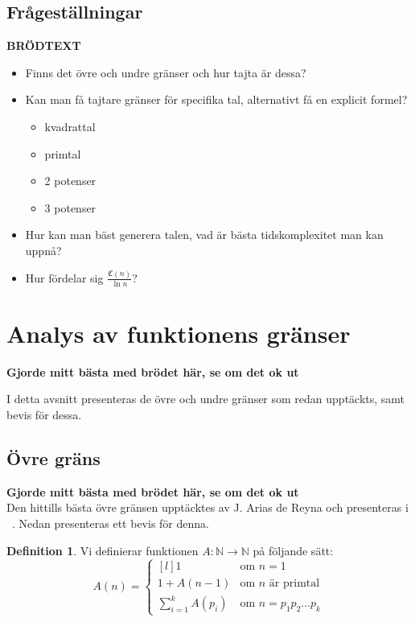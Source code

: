 \documentclass[a4paper,titlepage]{article}
\newcommand{\N}{\mathbb{N}}
\newcommand{\C}[1]{\mathfrak C \left( #1 \right)}
\newcommand{\FIX}[1]{{\color{red} \bf #1}}
\theoremstyle{definition}
\newtheorem{definition}{Definition}
\begin{document}
    \subsection{Frågeställningar}
        \FIX{BRÖDTEXT}
        \begin{itemize}
            \item Finns det övre och undre gränser och hur tajta är dessa?
            \item Kan man få tajtare gränser för specifika tal, alternativt få
                en explicit formel?
                \begin{itemize}
                    \item kvadrattal
                    \item primtal
                    \item 2 potenser
                    \item 3 potenser

                \end{itemize}
            \item Hur kan man bäst generera talen, vad är bästa tidskomplexitet
                man kan uppnå?
            \item Hur fördelar sig $\frac{\C{n}}{\ln{n}}$?
        \end{itemize}


\section{Analys av funktionens gränser}
    \FIX{Gjorde mitt bästa med brödet här, se om det ok ut}

    I detta avsnitt presenteras de övre och undre gränser som redan upptäckts,
    samt bevis för dessa.
    \subsection{Övre gräns}
    \label{ovregrans}
    \FIX{Gjorde mitt bästa med brödet här, se om det ok ut}\\
    Den hittills bästa övre gränsen upptäcktes av J. Arias de
    Reyna och presenteras i ~\cite{spansk}.
    Nedan presenteras ett bevis för denna.
    \begin{definition}
        Vi definierar funktionen $A:\N\to\N$ på följande sätt:
        $$ A(n) = \left\{ \begin{matrix*}[l] 1 & \text{om } n=1 \\ 1+A(n-1) & \text{om $n$ är primtal} \\ \sum_{i=1}^kA(p_i) & \text{om } n=p_1p_2 \ldots p_k \end{matrix*} \right. $$
    \end{definition}
\end{document}
